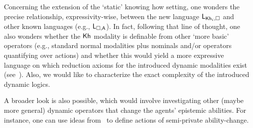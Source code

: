 \begin{mrevised}
Concerning the extension of the `static' knowing how setting, one wonders the precise relationship, expressivity-wise, between the new language $\mathsf{L}_{{\sf Kh}_i,\square}$ and other known languages (e.g., $\mathsf{L}_{\square,{\sf A}}$). In fact, following that line of thought, one also wonders whether the ${\sf Kh}$ modality is definable from other `more basic' operators (e.g., standard normal modalities plus nominals and/or operators quantifying over actions) and whether this would yield a more expressive language on which reduction axioms for the introduced dynamic modalities exist (see~\cite{BenthemMZ2022}). Also, we would like to characterize the exact complexity of the introduced dynamic logics.

A broader look is also possible, which would involve investigating other (maybe more general) dynamic operators that change the agents' epistemic abilities. For instance, one can use ideas from~\cite{BaltagMS98,GalimullinA22} to define actions of semi-private ability-change. 
\end{mrevised}
 
